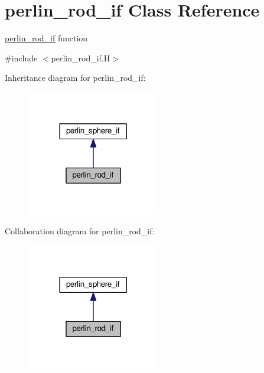 \hypertarget{classperlin__rod__if}{}\section{perlin\+\_\+rod\+\_\+if Class Reference}
\label{classperlin__rod__if}


\hyperlink{classperlin__rod__if}{perlin\+\_\+rod\+\_\+if} function  




{\ttfamily \#include $<$perlin\+\_\+rod\+\_\+if.\+H$>$}



Inheritance diagram for perlin\+\_\+rod\+\_\+if\+:\nopagebreak
\begin{figure}[H]
\begin{center}
\leavevmode
\includegraphics[width=165pt]{classperlin__rod__if__inherit__graph}
\end{center}
\end{figure}


Collaboration diagram for perlin\+\_\+rod\+\_\+if\+:\nopagebreak
\begin{figure}[H]
\begin{center}
\leavevmode
\includegraphics[width=165pt]{classperlin__rod__if__coll__graph}
\end{center}
\end{figure}
